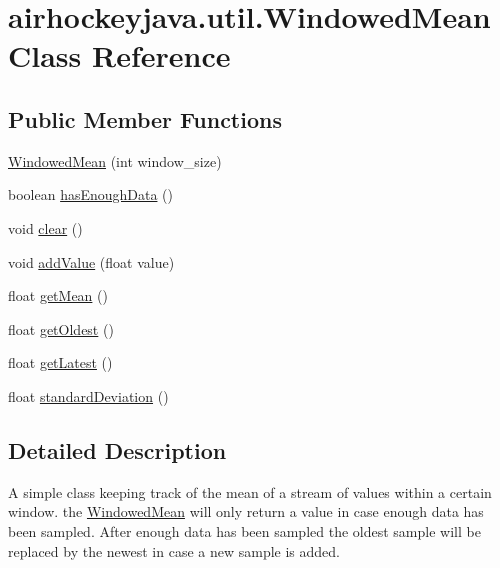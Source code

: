 \hypertarget{classairhockeyjava_1_1util_1_1_windowed_mean}{}\section{airhockeyjava.\+util.\+Windowed\+Mean Class Reference}
\label{classairhockeyjava_1_1util_1_1_windowed_mean}
\subsection*{Public Member Functions}
\begin{DoxyCompactItemize}
\item 
\hyperlink{classairhockeyjava_1_1util_1_1_windowed_mean_a01174171588fa1cb761fc73789e6438f}{Windowed\+Mean} (int window\+\_\+size)
\item 
boolean \hyperlink{classairhockeyjava_1_1util_1_1_windowed_mean_ab4fdcd6a109fe2e15ee241b645d70436}{has\+Enough\+Data} ()
\item 
void \hyperlink{classairhockeyjava_1_1util_1_1_windowed_mean_a237f873e3427ea6d2d704426973d7525}{clear} ()
\item 
void \hyperlink{classairhockeyjava_1_1util_1_1_windowed_mean_acf6e2efc9b18226d56ce966557ce8f9d}{add\+Value} (float value)
\item 
float \hyperlink{classairhockeyjava_1_1util_1_1_windowed_mean_a14e5e757007bea1a08d952f156b13721}{get\+Mean} ()
\item 
float \hyperlink{classairhockeyjava_1_1util_1_1_windowed_mean_adcf9e5d15a655561086d16f605c6cdae}{get\+Oldest} ()
\item 
float \hyperlink{classairhockeyjava_1_1util_1_1_windowed_mean_adf524389aa0dd7be207238e0a96c43ef}{get\+Latest} ()
\item 
float \hyperlink{classairhockeyjava_1_1util_1_1_windowed_mean_a60cd82bf898d77deb1c00bb7b0c17483}{standard\+Deviation} ()
\end{DoxyCompactItemize}


\subsection{Detailed Description}
A simple class keeping track of the mean of a stream of values within a certain window. the \hyperlink{classairhockeyjava_1_1util_1_1_windowed_mean}{Windowed\+Mean} will only return a value in case enough data has been sampled. After enough data has been sampled the oldest sample will be replaced by the newest in case a new sample is added.

